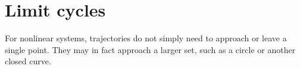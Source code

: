 

\sectionnewpage
\section{Limit cycles}
\label{limitcycles:section}


For nonlinear systems, trajectories do
not simply need to approach or leave a single point.  They may in fact approach a
larger set, such as a circle or another closed curve.

